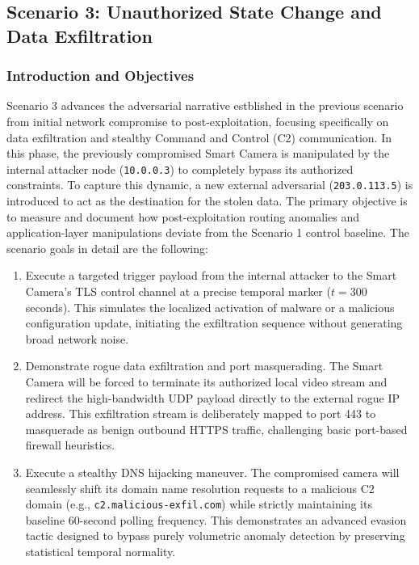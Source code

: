 \subsection{Scenario 3: Unauthorized State Change and Data Exfiltration}

\subsubsection{Introduction and Objectives}
Scenario 3 advances the adversarial narrative estblished in the previous scenario from initial network compromise to post-exploitation, focusing specifically on data exfiltration and stealthy Command and Control (C2) communication. In this phase, the previously compromised Smart Camera is manipulated by the internal attacker node (\texttt{10.0.0.3}) to completely bypass its authorized constraints. To capture this dynamic, a new external adversarial (\texttt{203.0.113.5}) is introduced to act as the destination for the stolen data. The primary objective is to measure and document how post-exploitation routing anomalies and application-layer manipulations deviate from the Scenario 1 control baseline. The scenario goals in detail are the following:

\begin{enumerate}
	\item Execute a targeted trigger payload from the internal attacker to the Smart Camera's TLS control channel at a precise temporal marker ($t=300$ seconds). This simulates the localized activation of malware or a malicious configuration update, initiating the exfiltration sequence without generating broad network noise.
	\item Demonstrate rogue data exfiltration and port masquerading. The Smart Camera will be forced to terminate its authorized local video stream and redirect the high-bandwidth UDP payload directly to the external rogue IP address. This exfiltration stream is deliberately mapped to port 443 to masquerade as benign outbound HTTPS traffic, challenging basic port-based firewall heuristics.
	\item Execute a stealthy DNS hijacking maneuver. The compromised camera will seamlessly shift its domain name resolution requests to a malicious C2 domain (e.g., \texttt{c2.malicious-exfil.com}) while strictly maintaining its baseline 60-second polling frequency. This demonstrates an advanced evasion tactic designed to bypass purely volumetric anomaly detection by preserving statistical temporal normality.
\end{enumerate}


